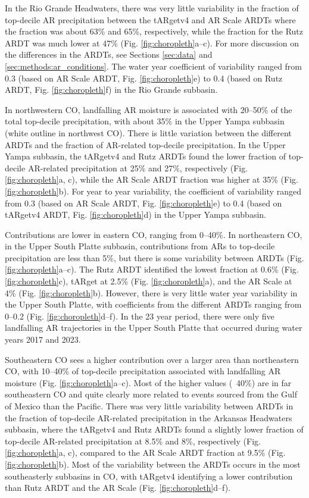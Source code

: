 \documentclass[draft]{agujournal2019}
\begin{document}
In the Rio Grande Headwaters, there was very little variability in the fraction of top-decile AR precipitation between the tARgetv4 and AR Scale ARDTs where the fraction was about 63\% and 65\%, respectively, while the fraction for the Rutz ARDT was much lower at 47\% (Fig. \ref{fig:choropleth}a--c). For more discussion on the differences in the ARDTs, see Sections \ref{sec:data} and \ref{sec:methods:ar_conditions}. The water year coefficient of variability ranged from 0.3 (based on AR Scale ARDT, Fig. \ref{fig:choropleth}e) to 0.4 (based on Rutz ARDT, Fig. \ref{fig:choropleth}f) in the Rio Grande subbasin.

In northwestern CO, landfalling AR moisture is associated with 20--50\% of the total top-decile precipitation, with about 35\% in the Upper Yampa subbasin (white outline in northwest CO). There is little variation between the different ARDTs and the fraction of AR-related top-decile precipitation. In the Upper Yampa subbasin, the tARgetv4 and Rutz ARDTs found the lower fraction of top-decile AR-related precipitation at 25\% and 27\%, respectively (Fig. \ref{fig:choropleth}a, c), while the AR Scale ARDT fraction was higher at 35\% (Fig. \ref{fig:choropleth}b). For year to year variability, the coefficient of variability ranged from 0.3 (based on AR Scale ARDT, Fig. \ref{fig:choropleth}e) to 0.4 (based on tARgetv4 ARDT, Fig. \ref{fig:choropleth}d) in the Upper Yampa subbasin.

Contributions are lower in eastern CO, ranging from 0--40\%. In northeastern CO, in the Upper South Platte subbasin, contributions from ARs to top-decile precipitation are less than 5\%, but there is some variability between ARDTs (Fig. \ref{fig:choropleth}a--c). The Rutz ARDT identified the lowest fraction at 0.6\% (Fig. \ref{fig:choropleth}c), tARget at 2.5\% (Fig. \ref{fig:choropleth}a), and the AR Scale at 4\% (Fig. \ref{fig:choropleth}b). However, there is very little water year variability in the Upper South Platte, with coefficients from the different ARDTs ranging from 0--0.2 (Fig. \ref{fig:choropleth}d--f). In the 23 year period, there were only five landfalling AR trajectories in the Upper South Platte that occurred during water years 2017 and 2023. 

Southeastern CO sees a higher contribution over a larger area than northeastern CO, with 10--40\% of top-decile precipitation associated with landfalling AR moisture (Fig. \ref{fig:choropleth}a--c). Most of the higher values (~40\%) are in far southeastern CO and quite clearly more related to events sourced from the Gulf of Mexico than the Pacific. There was very little variability between ARDTs in the fraction of top-decile AR-related precipitation in the Arkansas Headwaters subbasin, where the tARgetv4 and Rutz ARDTs found a slightly lower fraction of top-decile AR-related precipitation at 8.5\% and 8\%, respectively (Fig. \ref{fig:choropleth}a, c), compared to the AR Scale ARDT fraction at 9.5\% (Fig. \ref{fig:choropleth}b). Most of the variability between the ARDTs occurs in the most southeasterly subbasins in CO, with tARgetv4 identifying a lower contribution than Rutz ARDT and the AR Scale (Fig. \ref{fig:choropleth}d--f).
\end{document}
